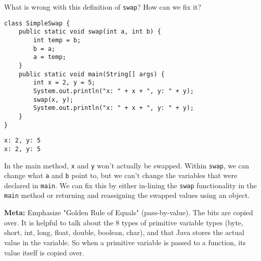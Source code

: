 \question What is wrong with this definition of \texttt{swap}? How can we fix it?

\begin{lstlisting}
class SimpleSwap {
    public static void swap(int a, int b) {
        int temp = b;
        b = a;
        a = temp;
    }
    public static void main(String[] args) {
        int x = 2, y = 5;
        System.out.println("x: " + x + ", y: " + y);
        swap(x, y);
        System.out.println("x: " + x + ", y: " + y);
    }
}
\end{lstlisting}

\begin{solution}
\begin{verbatim}
x: 2, y: 5
x: 2, y: 5
\end{verbatim}
In the main method, \texttt{x} and \texttt{y} won't actually be swapped.
Within \texttt{swap}, we can change what \texttt{a} and \texttt{b} point to, but we can't change the variables that were declared in \texttt{main}. We can fix this by either in-lining the \texttt{swap} functionality in the \texttt{main} method or returning and reassigning the swapped values using an object.

\textbf{Meta:} Emphasize "Golden Rule of Equals" (pass-by-value). The bits are copied over.
It is helpful to talk about the 8 types of primitive variable types (byte, short, int, long, float, double, boolean, char), and that Java stores the actual value in the variable. So when a primitive variable is passed to a function, its value itself is copied over. 
\end{solution}
